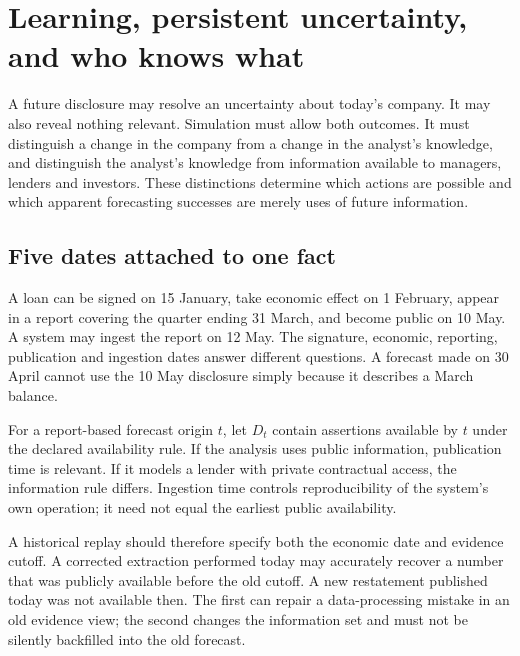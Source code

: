 \chapter[Learning and persistent uncertainty]{Learning, persistent uncertainty, and who knows what}
\label{sim:learning}

A future disclosure may resolve an uncertainty about today's company. It may also reveal nothing relevant. Simulation must allow both outcomes. It must distinguish a change in the company from a change in the analyst's knowledge, and distinguish the analyst's knowledge from information available to managers, lenders and investors. These distinctions determine which actions are possible and which apparent forecasting successes are merely uses of future information.

\section{Five dates attached to one fact}
A loan can be signed on 15 January, take economic effect on 1 February, appear in a report covering the quarter ending 31 March, and become public on 10 May. A system may ingest the report on 12 May. The signature, economic, reporting, publication and ingestion dates answer different questions. A forecast made on 30 April cannot use the 10 May disclosure simply because it describes a March balance.

For a report-based forecast origin $t$, let $D_t$ contain assertions available by $t$ under the declared availability rule. If the analysis uses public information, publication time is relevant. If it models a lender with private contractual access, the information rule differs. Ingestion time controls reproducibility of the system's own operation; it need not equal the earliest public availability.

A historical replay should therefore specify both the economic date and evidence cutoff. A corrected extraction performed today may accurately recover a number that was publicly available before the old cutoff. A new restatement published today was not available then. The first can repair a data-processing mistake in an old evidence view; the second changes the information set and must not be silently backfilled into the old forecast.

